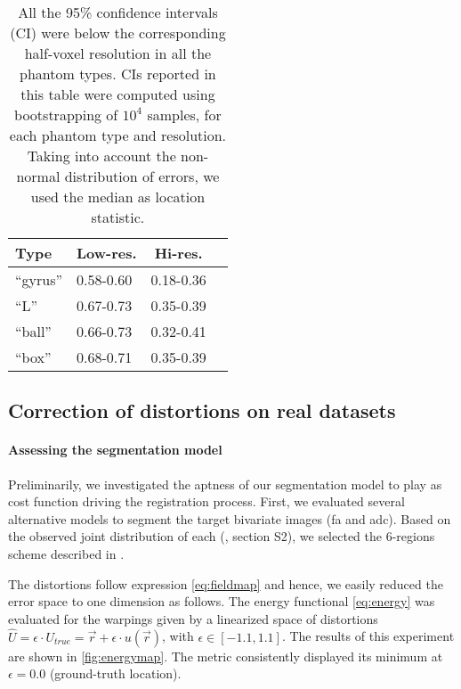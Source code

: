 \begin{table}
		\centering
		\footnotesize
    \begin{tabular}{llcc}
    Type      & Low-res.  & Hi-res. \\
    \hline
    ``gyrus'' & 0.58-0.60 & 0.18-0.36 \\
    ``L''     & 0.67-0.73 & 0.35-0.39 \\
    ``ball''  & 0.66-0.73 & 0.32-0.41 \\
    ``box''   & 0.68-0.71 & 0.35-0.39 \\
    \hline
    \end{tabular}
    \caption{All the 95\% confidence intervals (CI) were below the corresponding
      half-voxel resolution in all the phantom types.
    CIs reported in this table were computed using bootstrapping of $10^4$ samples,
      for each phantom type and resolution.
    Taking into account the non-normal distribution of errors, we used the median as location
  		statistic.}\label{tab:ci_phantom}
\end{table}

\subsection*{Correction of distortions on real datasets}\label{sec:results_hcp}

\paragraph*{Assessing the segmentation model}\label{sec:res_model_and_metric} %
%
Preliminarily, we investigated the aptness of our segmentation model to play as cost function
  driving the registration process.
First, we evaluated several alternative models to segment the target bivariate images
  (\gls*{fa} and \gls*{adc}).
Based on the observed joint distribution of each (\suppl{}, {\color{red} section S2}),
  we selected the 6-regions scheme described in .

The distortions follow expression \eqref{eq:fieldmap} and hence, we easily reduced the
  error space to one dimension as follows.
The energy functional \eqref{eq:energy} was evaluated for the warpings given by
  a linearized space of distortions
  $\hat{U} = \epsilon \cdot U_{true} = \vec{r} + \epsilon \cdot u(\vec{r})$,
  with $\epsilon \in [-1.1, 1.1]$.
The results of this experiment are shown in \autoref{fig:energymap}.
The metric consistently displayed its minimum at $\epsilon=0.0$ (ground-truth location).


